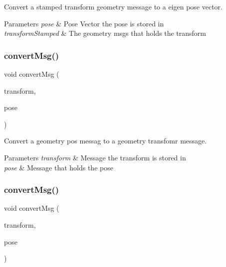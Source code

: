 Convert a stamped transform geometry message to a eigen pose vector. 


\begin{DoxyParams}{Parameters}
{\em pose} & Pose Vector the pose is stored in \\
\hline
{\em transform\+Stamped} & The geometry msgs that holds the transform \\
\hline
\end{DoxyParams}
\mbox{\label{group__multi__robot__controller_ga27bedbf17c4aa6e228239ef1f1009e2b}} 
\subsubsection{\texorpdfstring{convert\+Msg()}{convertMsg()}\hspace{0.1cm}{\footnotesize\ttfamily [13/14]}}
{\footnotesize\ttfamily void convert\+Msg (\begin{DoxyParamCaption}\item[{geometry\+\_\+msgs\+::\+Transform \&}]{transform,  }\item[{geometry\+\_\+msgs\+::\+Pose \&}]{pose }\end{DoxyParamCaption})\hspace{0.3cm}{\ttfamily [inline]}}



Convert a geometry pos messag to a geometry transfomr message. 


\begin{DoxyParams}{Parameters}
{\em transform} & Message the transform is stored in \\
\hline
{\em pose} & Message that holds the pose \\
\hline
\end{DoxyParams}
\mbox{\label{group__multi__robot__controller_ga83f417b8e164774e4926508549543498}} 
\subsubsection{\texorpdfstring{convert\+Msg()}{convertMsg()}\hspace{0.1cm}{\footnotesize\ttfamily [14/14]}}
{\footnotesize\ttfamily void convert\+Msg (\begin{DoxyParamCaption}\item[{geometry\+\_\+msgs\+::\+Transform\+Stamped \&}]{transform,  }\item[{geometry\+\_\+msgs\+::\+Pose\+Stamped \&}]{pose }\end{DoxyParamCaption})\hspace{0.3cm}{\ttfamily [inline]}}



